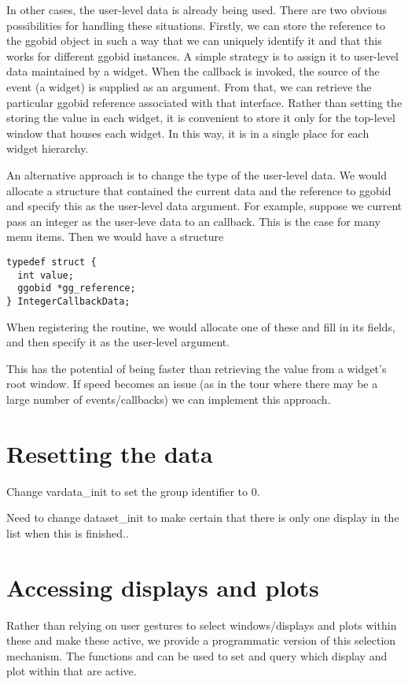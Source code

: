 In other cases, the user-level data is already being used.  There are
two obvious possibilities for handling these situations.  Firstly, we
can store the reference to the ggobid object in such a way that we can
uniquely identify it and that this works for different ggobid
instances. A simple strategy is to assign it to user-level data
maintained by a widget.  When the callback is invoked, the source of
the event (a widget) is supplied as an argument. From that, we can
retrieve the particular ggobid reference associated with that
interface. Rather than setting the storing the value in each widget,
it is convenient to store it only for the top-level window that houses
each widget. In this way, it is in a single place for each widget
hierarchy.

An alternative approach is to change the type of the user-level data.
We would allocate a structure that contained the current data and the
reference to ggobid and specify this as the user-level data argument.
For example, suppose we current pass an integer as the user-leve data
to an callback. This is the case for many menu items.  Then we would
have a structure
\begin{verbatim}
typedef struct {
  int value;
  ggobid *gg_reference;
} IntegerCallbackData;
\end{verbatim}
When registering the routine, we would allocate one of these and
fill in its fields, and then specify it as the user-level argument.


This has the potential of being faster than retrieving the value from
a widget's root window. If speed becomes an issue (as in the tour
where there may be a large number of events/callbacks) we can
implement this approach.



\section{Resetting the data}

Change vardata_init to set the group identifier to 0.


Need to change dataset_init to make certain that there is only
one display in the list when this is finished..



\section{Accessing displays and plots}
Rather than relying on user gestures to select windows/displays and
plots within these and make these active, we provide a programmatic
version of this selection mechanism.  The functions
 and  can be used to
set and query which display and plot within that are active.


